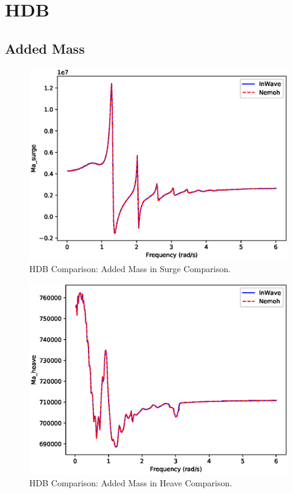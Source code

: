 \documentclass[11pt]{article}
\begin{document}
\section{HDB}
\label{sec:org495e0d0}
\subsection{Added Mass}
\label{sec:org7227b48}

\begin{figure}[htbp]
\centering
\includegraphics[width=.9\linewidth]{images/hdb/Ma_surge.eps}
\caption{HDB Comparison: Added Mass in Surge Comparison.}
\end{figure}

\begin{figure}[htbp]
\centering
\includegraphics[width=.9\linewidth]{images/hdb/Ma_heave.eps}
\caption{HDB Comparison: Added Mass in Heave Comparison.}
\end{figure}
\end{document}
